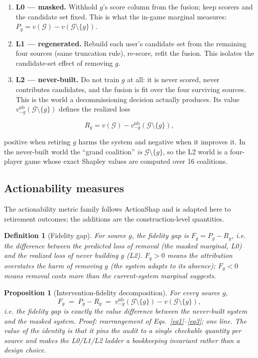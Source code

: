 \documentclass[pdflatex,sn-mathphys-num]{sn-jnl}
\theoremstyle{thmstyleone}%
\newtheorem{proposition}[theorem]{Proposition}%
\theoremstyle{thmstyletwo}%
\theoremstyle{thmstylethree}%
\newtheorem{definition}{Definition}%
\newcommand{\Gset}{\mathcal{G}}
\newcommand{\reg}{R}
\newcommand{\pred}{P}
\begin{document}
\begin{enumerate}
\item \textbf{L0 --- masked.} Withhold $g$'s score column from the fusion; keep scorers and the candidate set fixed. This is what the in-game marginal measures: $\pred_g = v(\Gset) - v(\Gset\setminus\{g\})$.
\item \textbf{L1 --- regenerated.} Rebuild each user's candidate set from the remaining four sources (same truncation rule), re-score, refit the fusion. This isolates the candidate-set effect of removing $g$.
\item \textbf{L2 --- never-built.} Do not train $g$ at all: it is never scored, never contributes candidates, and the fusion is fit over the four surviving sources. This is the world a decommissioning decision actually produces. Its value $v^{\mathrm{nb}}_{-g}(\Gset\setminus\{g\})$ defines the realized loss
\end{enumerate}

\begin{equation}
\reg_g = v(\Gset) - v^{\mathrm{nb}}_{-g}(\Gset\setminus\{g\}),
\label{eq3}
\end{equation}

positive when retiring $g$ harms the system and negative when it improves it. In the never-built world the ``grand coalition'' \emph{is} $\Gset\setminus\{g\}$, so the L2 world is a four-player game whose exact Shapley values are computed over 16 coalitions.

\subsection{Actionability measures}\label{subsec3_3}

The actionability metric family follows ActionShap \cite{louhichi2026actionshap} and is adapted here to retirement outcomes; the additions are the construction-level quantities.

\begin{definition}[Fidelity gap]\label{def1}
For source $g$, the fidelity gap is $F_g = \pred_g - \reg_g$, i.e. the difference between the predicted loss of removal (the masked marginal, L0) and the realized loss of never building $g$ (L2). $F_g>0$ means the attribution overstates the harm of removing $g$ (the system adapts to its absence); $F_g<0$ means removal costs more than the current-system marginal suggests.
\end{definition}

\begin{proposition}[Intervention-fidelity decomposition]\label{prop1}
For every source $g$,
\[
F_g \;=\; \pred_g - \reg_g \;=\; v^{\mathrm{nb}}_{-g}(\Gset\setminus\{g\}) - v(\Gset\setminus\{g\}),
\]
i.e. the fidelity gap is exactly the value difference between the never-built system and the masked system. \emph{Proof: rearrangement of Eqs.~\eqref{eq1}--\eqref{eq3}; one line.} The value of the identity is that it pins the audit to a single checkable quantity per source and makes the L0/L1/L2 ladder a bookkeeping invariant rather than a design choice.
\end{proposition}
\end{document}
